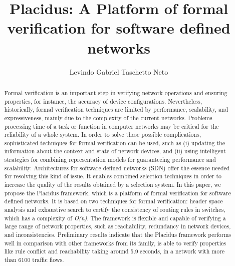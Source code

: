 \documentclass[12pt]{article}
\title{Placidus: A Platform of formal verification for software defined networks}
\author{Levindo Gabriel Taschetto Neto\inst{1}}
\begin{document}
 

\maketitle

\begin{abstract}
Formal verification is an important step in verifying network operations and ensuring properties, for instance, the accuracy of device configurations. Nevertheless, historically, formal verification techniques are limited by performance, scalability, and expressiveness, mainly due to the complexity of the current networks.
Problems processing time of a task or function in computer networks may be critical for the reliability of a whole system.
In order to solve these possible complications, sophisticated techniques for formal verification can be used, such as (i) updating the information about the context and state of network devices, and (ii) using intelligent strategies for combining representation models for guaranteeing performance and scalability.
Architectures for software defined networks (SDN) offer the essence needed for resolving this kind of issue. It enables combined selection techniques in order to increase the quality of the results obtained by a selection system.
In this paper, we propose the Placidus framework, which is a platform of formal verification for software defined networks. It is based on two techniques for formal verification: header space analysis and exhaustive search to certify the consistency of routing rules in switches, which has a complexity of \textit{O(n)}.
The framework is flexible and capable of verifying a large range of network properties, such as reachability, redundancy in network devices, and inconsistencies.
Preliminary results indicate that the Placidus framework performs well in comparison with other frameworks from its family, is able to verify properties like rule conflict and reachability taking around 5.9 seconds, in a network with more than 6100 traffic flows.
\end{abstract}
\end{document}
